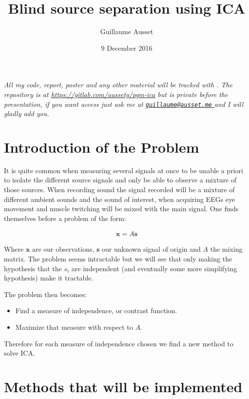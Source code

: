 \documentclass[11pt]{article}
\begin{document}
\date{9 December 2016}
\author{Guillaume Ausset}
\title{Blind source separation using ICA}
\maketitle

\emph{All my code, report, poster and any other material will be tracked with . The repository is at \url{https://gitlab.com/aussetg/pgm-ica} but is private before the presentation, if you want access just ask me at \href{mailto:guillaume@ausset.me}{\nolinkurl{guillaume@ausset.me} } and I will gladly add you.}

\section{Introduction of the Problem}

It is quite common when measuring several signals at once to be unable a priori to isolate the different source signals and only be able to observe a mixture of those sources. When recording sound the signal recorded will be a mixture of different ambient sounds and the sound of interest, when acquiring EEGs eye movement and muscle twitching will be mixed with the main signal. One finds themselves before a problem of the form:

\begin{align*}
	\mathbf{x} = A \mathbf{s}
\end{align*} 

Where $\mathbf{x}$ are our observations, $\mathbf{s}$ our unknown signal of origin and $A$ the mixing matrix.
The problem seems intractable but we will see that only making the hypothesis that the $s_i$ are independent (and eventually some more simplifying hypothesis) make it tractable.

The problem then becomes:
\begin{itemize}
	\item Find a measure of independence, or contrast function.
	\item Maximize that measure with respect to $A$.
\end{itemize}

Therefore for each measure of independence chosen we find a new method to solve ICA.

\section{Methods that will be implemented}
\end{document}
